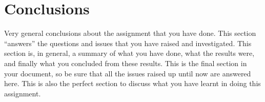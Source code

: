 \documentclass[conference]{IEEEtran}
\begin{document}
\section{Conclusions}
Very general conclusions about the assignment that you have done. This section “answers” the questions and issues that you have raised and investigated. This section is, in general, a summary of what you have done, what the results were, and finally what you concluded from these results. This is the final section in your document, so be sure that all the issues raised up until now are answered here. This is also the perfect section to discuss what you have learnt in doing this assignment.


\end{document}
